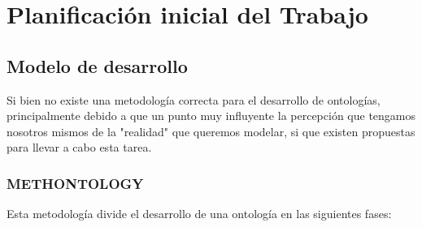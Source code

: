 \chapter{Planificación inicial del Trabajo}

\section{Modelo de desarrollo}

Si bien no existe una metodología correcta para el desarrollo de ontologías, principalmente debido a que un punto muy influyente la percepción que tengamos nosotros mismos de la "realidad" que queremos modelar, si que existen propuestas para llevar a cabo esta tarea.

\subsection{METHONTOLOGY}

Esta metodología divide el desarrollo de una ontología en las siguientes fases:

